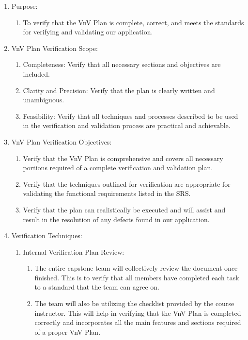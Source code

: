 \documentclass[12pt, titlepage]{article}
\begin{document}
\begin{enumerate}
\item Purpose:
\begin{enumerate}
\item To verify that the VnV Plan is complete, correct, and
meets the standards for verifying and validating our application.
\end{enumerate}

\item VnV Plan Verification Scope:
\begin{enumerate}
\item Completeness: Verify that all necessary sections
and objectives are included.
\item Clarity and Precision: Verify that the plan is
clearly written and unambiguous.
\item Feasibility: Verify that all techniques and
processes described to be used in the verification and
validation process are practical and achievable.
\end{enumerate}

\item VnV Plan Verification Objectives:
\begin{enumerate}
\item Verify that the VnV Plan is comprehensive and covers
all necessary portions required of a complete verification
and validation plan.
\item Verify that the techniques outlined for verification
are appropriate for validating the functional requirements
listed in the SRS.
\item Verify that the plan can realistically be executed and
will assist and result in the resolution of any defects
found in our application.
\end{enumerate}

\item Verification Techniques:
\begin{enumerate}
\item Internal Verification Plan Review:
\begin{enumerate}
\item The entire capstone team will collectively review the
document once finished. This is to verify that all members
have completed each task to a standard that the team can agree on.
\item The team will also be utilizing the checklist provided
by the course instructor. This will help in verifying that
the VnV Plan is completed correctly and incorporates all
the main features and sections required of a proper VnV Plan.
\end{enumerate}


\end{enumerate}
\end{enumerate}
\end{document}
